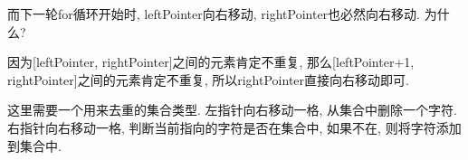 \documentclass[oneside]{ctexbook}
\begin{document}
而下一轮for循环开始时, leftPointer向右移动, rightPointer也必然向右移动. 为什么?

因为[leftPointer, rightPointer]之间的元素肯定不重复, 那么[leftPointer+1, rightPointer]之间的元素肯定不重复, 所以rightPointer直接向右移动即可.

这里需要一个用来去重的集合类型. 左指针向右移动一格, 从集合中删除一个字符. 右指针向右移动一格, 判断当前指向的字符是否在集合中, 如果不在, 则将字符添加到集合中.


\begin{tikzpicture}[x=0.75pt,y=0.75pt,yscale=-1,xscale=1]


\end{tikzpicture}
\end{document}
